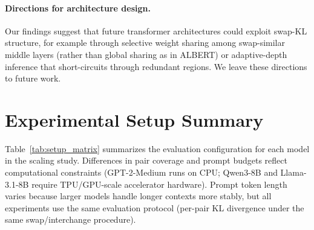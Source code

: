 \documentclass{article}
\newenvironment{tabhere}{%
  \par\medskip
  \begin{center}
}{%
  \end{center}
  \medskip
}
\begin{document}
\paragraph{Directions for architecture design.}
Our findings suggest that future transformer architectures could exploit swap-KL structure, for example through selective weight sharing among swap-similar middle layers (rather than global sharing as in ALBERT) or adaptive-depth inference that short-circuits through redundant regions. We leave these directions to future work.

\section{Experimental Setup Summary}
\label{sec:app_setup}

Table~\ref{tab:setup_matrix} summarizes the evaluation configuration for each model in the scaling study. Differences in pair coverage and prompt budgets reflect computational constraints (GPT-2-Medium runs on CPU; Qwen3-8B and Llama-3.1-8B require TPU/GPU-scale accelerator hardware). Prompt token length varies because larger models handle longer contexts more stably, but all experiments use the same evaluation protocol (per-pair KL divergence under the same swap/interchange procedure).

\begin{tabhere}
\label{tab:setup_matrix}
\end{tabhere}
\end{document}
